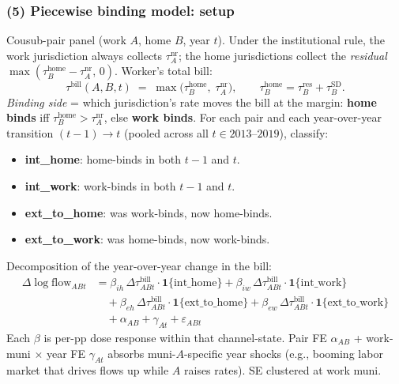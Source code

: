 \documentclass[xcolor = x11names, compress, aspectratio = 169]{beamer}
\renewcommand{\(}{\begin{columns}}
\renewcommand{\)}{\end{columns}}
\newcommand{\<}[1]{\begin{column}{#1}}
\renewcommand{\>}{\end{column}}
\begin{document}
\iffalse
\begin{frame}
\frametitle{(5) Piecewise binding model: setup}
    \scriptsize
    Cousub-pair panel (work $A$, home $B$, year $t$). Under the
    institutional rule, the work jurisdiction always collects
    $\tau^{\text{nr}}_A$; the home jurisdictions collect the
    \emph{residual} $\max(\tau^{\text{home}}_B - \tau^{\text{nr}}_A,\,0)$.
    Worker's total bill:
    \[
        \tau^{\text{bill}}(A,B,t)
        \;=\; \max\!\bigl(\tau^{\text{home}}_B,\; \tau^{\text{nr}}_A\bigr),
        \qquad
        \tau^{\text{home}}_B = \tau^{\text{res}}_B + \tau^{\text{SD}}_B.
    \]
    \emph{Binding side} = which jurisdiction's rate moves the bill at the
    margin: \textbf{home binds} iff $\tau^{\text{home}}_B > \tau^{\text{nr}}_A$,
    else \textbf{work binds}.
    For each pair and each year-over-year transition $(t-1)\!\to\!t$
    (pooled across all $t \in 2013\text{--}2019$), classify:
    \begin{itemize}\setlength{\itemsep}{0.04cm}
        \item \textbf{int\_home}: home-binds in both $t-1$ and $t$.
        \item \textbf{int\_work}: work-binds in both $t-1$ and $t$.
        \item \textbf{ext\_to\_home}: was work-binds, now home-binds.
        \item \textbf{ext\_to\_work}: was home-binds, now work-binds.
    \end{itemize}
    Decomposition of the year-over-year change in the bill:
    \begin{align*}
        \Delta\log\text{flow}_{ABt} &=
        \beta_{ih}\,\Delta\tau^{\text{bill}}_{ABt}\!\cdot\!\mathbf{1}\{\text{int\_home}\}
      + \beta_{iw}\,\Delta\tau^{\text{bill}}_{ABt}\!\cdot\!\mathbf{1}\{\text{int\_work}\} \\
      &\quad
      + \beta_{eh}\,\Delta\tau^{\text{bill}}_{ABt}\!\cdot\!\mathbf{1}\{\text{ext\_to\_home}\}
      + \beta_{ew}\,\Delta\tau^{\text{bill}}_{ABt}\!\cdot\!\mathbf{1}\{\text{ext\_to\_work}\} \\
      &\quad + \alpha_{AB} + \gamma_{At} + \varepsilon_{ABt}
    \end{align*}
    Each $\beta$ is per-pp dose response within that channel-state.
    Pair FE $\alpha_{AB}$ + work-muni $\times$ year FE $\gamma_{At}$
    absorbs muni-$A$-specific year shocks (e.g., booming labor
    market that drives flows up while $A$ raises rates). SE clustered
    at work muni.
\end{frame}
\end{document}
